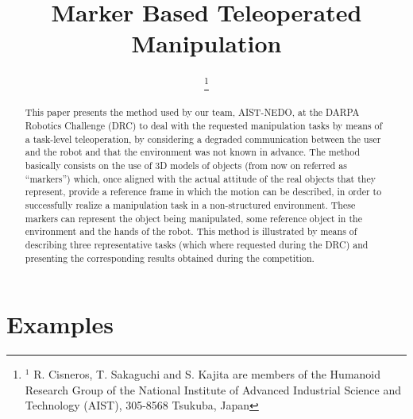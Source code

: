 \documentclass[letterpaper, 10 pt, conference]{ieeeconf}
\begin{document}
	\title{\LARGE \bf Marker Based Teleoperated Manipulation}

	\author{
		\and
		\and
		\thanks{$^{1}$ R. Cisneros, T. Sakaguchi and S. Kajita are members of the
						Humanoid Research Group of the National Institute of Advanced Industrial Science
						and Technology (AIST), 305-8568 Tsukuba, Japan}}
  
	\maketitle

	\thispagestyle{empty}
	\pagestyle{empty}

	\begin{abstract}
		This paper presents the method used by our team, AIST-NEDO, at the DARPA Robotics Challenge (DRC) to deal with
		the requested manipulation tasks by means of a task-level teleoperation, by considering a degraded communication
		between the user and the robot and that the environment was not known in advance.
		The method basically consists on the use of 3D models of objects (from now on referred as ``markers'') which,
		once aligned with the actual attitude of the real objects that they represent, provide a reference frame in
		which the motion can be described, in order to successfully realize a manipulation task in a non-structured
		environment.
		These markers can represent the object being manipulated, some reference object in the environment and the
		hands of the robot.
		This method is illustrated by means of describing three representative tasks (which where requested during the DRC)
		and presenting the corresponding results obtained during the competition.
	\end{abstract}

	
	
		
		
	
		
	\section{Examples}
		
		
		
		
		
		
		
	
	
	
	
	
	
	
\end{document}
